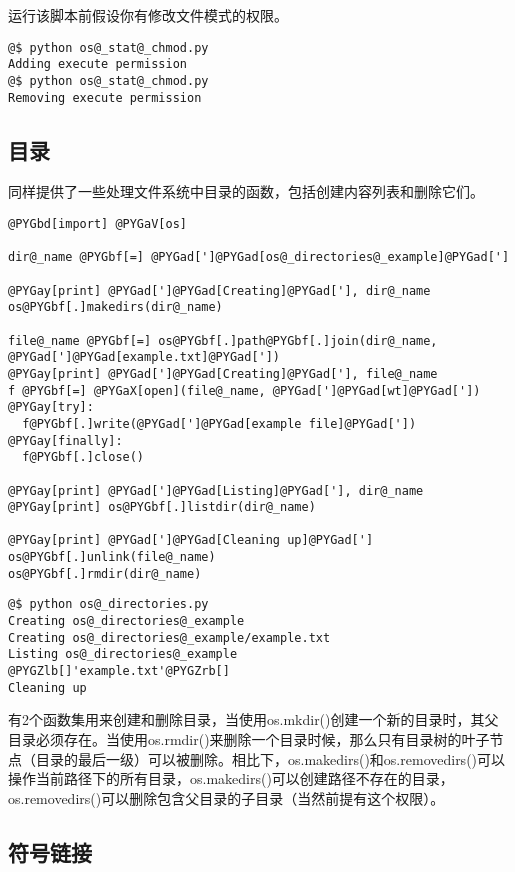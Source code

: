 \documentclass[letterpaper,10pt,english]{manual}
\begin{document}
运行该脚本前假设你有修改文件模式的权限。

\begin{Verbatim}[commandchars=@\[\]]
@$ python os@_stat@_chmod.py
Adding execute permission
@$ python os@_stat@_chmod.py
Removing execute permission
\end{Verbatim}


\subsection{目录}

同样提供了一些处理文件系统中目录的函数，包括创建内容列表和删除它们。

\begin{Verbatim}[commandchars=@\[\]]
@PYGbd[import] @PYGaV[os]

dir@_name @PYGbf[=] @PYGad[']@PYGad[os@_directories@_example]@PYGad[']

@PYGay[print] @PYGad[']@PYGad[Creating]@PYGad['], dir@_name
os@PYGbf[.]makedirs(dir@_name)

file@_name @PYGbf[=] os@PYGbf[.]path@PYGbf[.]join(dir@_name, @PYGad[']@PYGad[example.txt]@PYGad['])
@PYGay[print] @PYGad[']@PYGad[Creating]@PYGad['], file@_name
f @PYGbf[=] @PYGaX[open](file@_name, @PYGad[']@PYGad[wt]@PYGad['])
@PYGay[try]:
  f@PYGbf[.]write(@PYGad[']@PYGad[example file]@PYGad['])
@PYGay[finally]:
  f@PYGbf[.]close()

@PYGay[print] @PYGad[']@PYGad[Listing]@PYGad['], dir@_name
@PYGay[print] os@PYGbf[.]listdir(dir@_name)

@PYGay[print] @PYGad[']@PYGad[Cleaning up]@PYGad[']
os@PYGbf[.]unlink(file@_name)
os@PYGbf[.]rmdir(dir@_name)
\end{Verbatim}

\begin{Verbatim}[commandchars=@\[\]]
@$ python os@_directories.py
Creating os@_directories@_example
Creating os@_directories@_example/example.txt
Listing os@_directories@_example
@PYGZlb[]'example.txt'@PYGZrb[]
Cleaning up
\end{Verbatim}

有2个函数集用来创建和删除目录，当使用os.mkdir()创建一个新的目录时，其父目录必须存在。当使用os.rmdir()来删除一个目录时候，那么只有目录树的叶子节点（目录的最后一级）可以被删除。相比下，os.makedirs()和os.removedirs()可以操作当前路径下的所有目录，os.makedirs()可以创建路径不存在的目录，os.removedirs()可以删除包含父目录的子目录（当然前提有这个权限）。


\subsection{符号链接}
\end{document}
